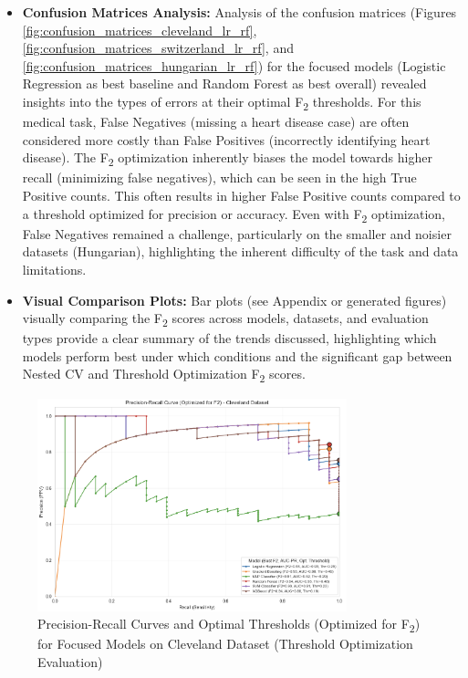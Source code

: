 \documentclass{article}
\begin{document}
\begin{itemize}
    \item \textbf{Confusion Matrices Analysis:} Analysis of the confusion matrices (Figures \ref{fig:confusion_matrices_cleveland_lr_rf}, \ref{fig:confusion_matrices_switzerland_lr_rf}, and \ref{fig:confusion_matrices_hungarian_lr_rf}) for the focused models (Logistic Regression as best baseline and Random Forest as best overall) revealed insights into the types of errors at their optimal F\textsubscript{2} thresholds. For this medical task, False Negatives (missing a heart disease case) are often considered more costly than False Positives (incorrectly identifying heart disease). The F\textsubscript{2} optimization inherently biases the model towards higher recall (minimizing false negatives), which can be seen in the high True Positive counts. This often results in higher False Positive counts compared to a threshold optimized for precision or accuracy. Even with F\textsubscript{2} optimization, False Negatives remained a challenge, particularly on the smaller and noisier datasets (Hungarian), highlighting the inherent difficulty of the task and data limitations.
    \item \textbf{Visual Comparison Plots:} Bar plots (see Appendix or generated figures) visually comparing the F\textsubscript{2} scores across models, datasets, and evaluation types provide a clear summary of the trends discussed, highlighting which models perform best under which conditions and the significant gap between Nested CV and Threshold Optimization F\textsubscript{2} scores.
\end{itemize}

\begin{figure}[htbp]
    \centering
    \includegraphics[width=0.8\textwidth]{plots/Cleveland_PR_Curve.png} %
    \caption{Precision-Recall Curves and Optimal Thresholds (Optimized for F\textsubscript{2}) for Focused Models on Cleveland Dataset (Threshold Optimization Evaluation)}
    \label{fig:pr_curve_cleveland}
\end{figure}
\end{document}
